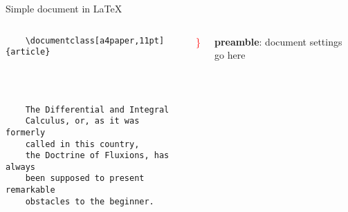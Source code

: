 

\begin{frame}[fragile, t]{Simple document in \LaTeX}
	\begin{columns}
        \begin{column}{0.5\textwidth}
	\begin{verbatim} 
	\documentclass[a4paper,11pt]{article}

		
	

	The Differential and Integral 
	Calculus, or, as it was formerly 
	called in this country, 
	the Doctrine of Fluxions, has always 
	been supposed to present remarkable 
	obstacles to the beginner.

	
	\end{verbatim}
\end{column}
\begin{column}{0.05\textwidth}
	{\Huge \textcolor{red}{ \} } }
	\\[2cm]
	\phantom{{\Huge \textcolor{red}{ \} } }}
	
\end{column}
\begin{column}{0.3\textwidth}
	\textbf{preamble}: document settings go here
	\\[2cm]
\end{column}
\end{columns}

\end{frame}
